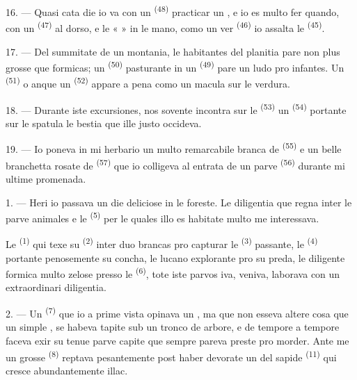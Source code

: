16. --- Quasi cata die io va con un  \textsuperscript{(48)}
practicar un , e io es multo fer quando, con un 
\textsuperscript{(47)} al dorso, e le «  » in le mano, como
un ver  \textsuperscript{(46)} io assalta le 
\textsuperscript{(45)}.

17. --- Del summitate de un montania, le habitantes del planitia pare non plus
grosse que formicas; un  \textsuperscript{(50)} pasturante
in un  \textsuperscript{(49)} pare un ludo pro infantes. Un
 \textsuperscript{(51)} o anque un 
\textsuperscript{(52)} appare a pena como un macula sur le verdura.

18. --- Durante iste excursiones, nos sovente incontra sur le 
\textsuperscript{(53)} un  \textsuperscript{(54)}
portante sur le spatula le bestia que ille justo occideva.

19. --- Io poneva in mi herbario un multo remarcabile branca de 
\textsuperscript{(55)} e un belle branchetta rosate de 
\textsuperscript{(57)} que io colligeva al entrata de un parve 
\textsuperscript{(56)} durante mi ultime promenada.

\VUsaut{3.0mm}
\VUsaut{3.0mm}

\VUsaut{3.0mm}

1. --- Heri io passava un die deliciose in le foreste. Le diligentia que regna
inter le parve animales e le  \textsuperscript{(5)} per le
quales illo es habitate multo me interessava.

Le  \textsuperscript{(1)} qui texe su 
\textsuperscript{(2)} inter duo brancas pro capturar le 
\textsuperscript{(3)} passante, le  \textsuperscript{(4)}
portante penosemente su concha, le lucano explorante pro su preda, le diligente
formica multo zelose presso le  \textsuperscript{(6)}, tote
iste parvos iva, veniva, laborava con un extraordinari diligentia.

2. --- Un  \textsuperscript{(7)} que io a prime vista opinava
un , ma que non esseva altere cosa que un simple
, se habeva tapite sub un tronco de arbore, e de tempore a
tempore faceva exir su tenue parve capite que sempre pareva preste pro morder.
Ante me un grosse  \textsuperscript{(8)} reptava pesantemente post
haber devorate un del sapide  \textsuperscript{(11)} qui cresce
abundantemente illac.

